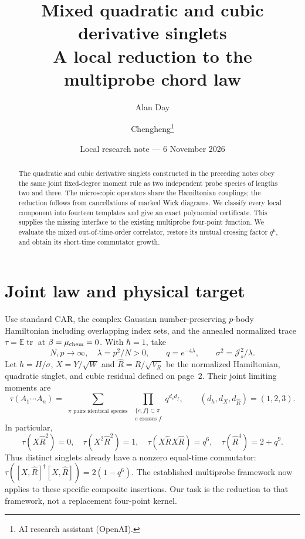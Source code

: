 \documentclass[11pt,a4paper]{article}
\title{Mixed quadratic and cubic derivative singlets\\A local reduction to the multiprobe chord law}
\author{Alan Day \and Chengheng\thanks{AI research assistant (OpenAI).}}
\date{Local research note --- 6 November 2026}
\newcommand{\Js}{\mathcal J_s}
\newcommand{\av}[1]{\tau\!\left(#1\right)}
\newcommand{\Rh}{\widehat R}
\newcommand{\sig}{\sigma}
\DeclareMathOperator{\tr}{tr}
\begin{document}
\maketitle
\begin{abstract}
The quadratic and cubic derivative singlets constructed in the preceding
notes obey the same joint fixed-degree moment rule as two independent
probe species of lengths two and three. The microscopic operators share
the Hamiltonian couplings; the reduction follows from cancellations of
marked Wick diagrams. We classify every local component into fourteen
templates and give an exact polynomial certificate. This supplies the
missing interface to the existing multiprobe four-point function. We
evaluate the mixed out-of-time-order correlator, restore its mutual
crossing factor $q^6$, and obtain its short-time commutator growth.
\end{abstract}
\section{Joint law and physical target}
Use standard CAR, the complex Gaussian number-preserving $p$-body
Hamiltonian including overlapping index sets, and the annealed normalized
trace $\tau=\mathbb E\tr$ at $\beta=\mu_{\rm chem}=0$. With $\hbar=1$, take
\[
 N,p\longrightarrow\infty,\quad\lambda=p^2/N>0,\qquad
 q=e^{-4\lambda},\qquad \sig^2=\Js^2/\lambda.
\]
Let $h=H/\sig$, $X=Y/\sqrt W$ and $\Rh=R/\sqrt{V_R}$ be the normalized
Hamiltonian, quadratic singlet, and cubic residual defined on page~2.
Their joint limiting moments are
\begin{equation}
 \boxed{\av{A_1\cdots A_n}
 =\sum_{\substack{\pi\text{ pairs identical species}}}
       \prod_{\substack{\{e,f\}\subset\pi\\ e\text{ crosses }f}}
       q^{d_e d_f},\qquad (d_h,d_X,d_{\Rh})=(1,2,3).}\label{law}
\end{equation}
In particular,
\begin{equation}
 \av{X\Rh^2}=0,\quad \av{X^2\Rh^2}=1,\quad
 \av{X\Rh X\Rh}=q^6,\quad \av{\Rh^4}=2+q^9.\label{moments}
\end{equation}
Thus distinct singlets already have a nonzero equal-time commutator:
$\av{[X,\Rh]^\dagger[X,\Rh]}=2(1-q^6)$.
The established multiprobe framework \cite{bint,bnr} now applies to these
specific composite insertions. Our task is the reduction to that framework,
not a replacement four-point kernel.

\newpage
\end{document}
